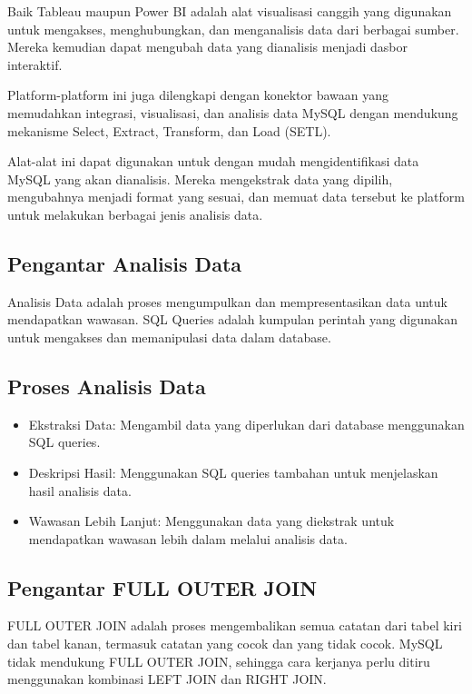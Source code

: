 \documentclass{article}
\begin{document}
Baik Tableau maupun Power BI adalah alat visualisasi canggih yang digunakan untuk mengakses, menghubungkan, dan menganalisis data dari berbagai sumber. Mereka kemudian dapat mengubah data yang dianalisis menjadi dasbor interaktif.

Platform-platform ini juga dilengkapi dengan konektor bawaan yang memudahkan integrasi, visualisasi, dan analisis data MySQL dengan mendukung mekanisme Select, Extract, Transform, dan Load (SETL).

Alat-alat ini dapat digunakan untuk dengan mudah mengidentifikasi data MySQL yang akan dianalisis. Mereka mengekstrak data yang dipilih, mengubahnya menjadi format yang sesuai, dan memuat data tersebut ke platform untuk melakukan berbagai jenis analisis data.

\subsection{Pengantar Analisis Data}
Analisis Data adalah proses mengumpulkan dan mempresentasikan data untuk mendapatkan wawasan. SQL Queries adalah kumpulan perintah yang digunakan untuk mengakses dan memanipulasi data dalam database.

\subsection{Proses Analisis Data}
\begin{itemize}
    \item Ekstraksi Data: Mengambil data yang diperlukan dari database menggunakan SQL queries.
    \item Deskripsi Hasil: Menggunakan SQL queries tambahan untuk menjelaskan hasil analisis data.
    \item Wawasan Lebih Lanjut: Menggunakan data yang diekstrak untuk mendapatkan wawasan lebih dalam melalui analisis data.
\end{itemize}

\subsection{Pengantar FULL OUTER JOIN}
FULL OUTER JOIN adalah proses mengembalikan semua catatan dari tabel kiri dan tabel kanan, termasuk catatan yang cocok dan yang tidak cocok. MySQL tidak mendukung FULL OUTER JOIN, sehingga cara kerjanya perlu ditiru menggunakan kombinasi LEFT JOIN dan RIGHT JOIN.
\end{document}
